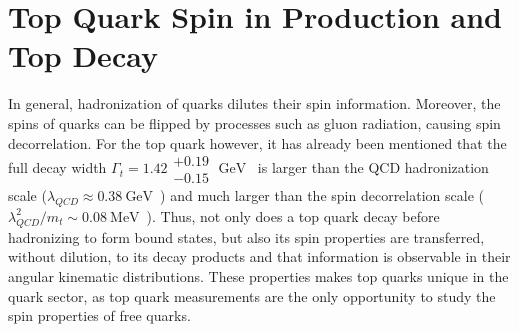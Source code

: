 \section{Top Quark Spin in \ttbar Production and Top Decay}
In general, hadronization of quarks dilutes their spin information.
Moreover, the spins of quarks can be flipped by processes such as gluon radiation, causing spin decorrelation.
For the top quark however, it has already been mentioned that the full decay width $\Gamma_t = 1.42 \substack{+0.19 \\ -0.15} \; \si{\GeV}$~\cite{bib:PDG} is larger than the QCD hadronization scale ($\lambda_{QCD} \approx \SI{0.38}{\GeV}$~\cite{Groote_1998}) and much larger than the spin decorrelation scale ($\lambda_{QCD}^2/m_t \sim \SI{0.08}{\MeV}$~\cite{Stelzer_1996}).
Thus, not only does a top quark decay before hadronizing to form bound states, but also its spin properties are transferred, without dilution, to its decay products and that information is observable in their angular kinematic distributions.
These properties makes top quarks unique in the quark sector, as top quark measurements are the only opportunity to study the spin properties of free quarks.

